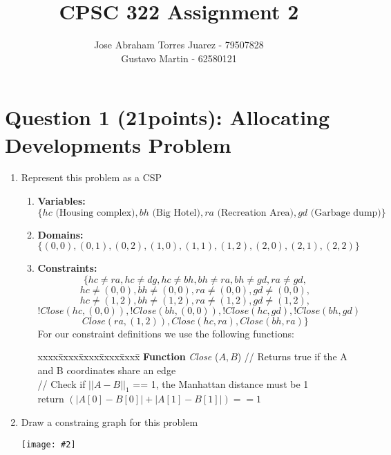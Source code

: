 \documentclass{article}
\def\ans#1{{\color{ans}#1}}
\newcommand{\centerfig}[2]{\begin{center}\texttt{[image: \#2]}\end{center}}
\begin{document}
\title{CPSC 322 Assignment 2}
\author{
    Jose Abraham Torres Juarez - 79507828 \\
    Gustavo Martin - 62580121
}
\date{}
\maketitle
\vspace{-2em}


\section{Question 1 (21points): Allocating Developments Problem}

\begin{enumerate}[label=(\alph*)]
    \item Represent this problem as a CSP
    \begin{enumerate}\color{ans}
        \item \textbf{Variables: }
        \[
            \{ hc \text{ (Housing complex)}, bh \text{ (Big Hotel)}, ra \text{ (Recreation Area)}, gd \text{ (Garbage dump)}\}
        \]
        \item \textbf{Domains: }
        \[
            \{ (0,0), (0,1), (0,2), (1,0), (1,1), (1,2), (2,0), (2,1), (2,2) \}
        \]
        \item \textbf{Constraints: }
        \[
            \{ hc \neq ra, hc \neq dg, hc \neq bh, bh \neq ra, bh \neq gd, ra \neq gd,
        \]
        \[
            hc \neq (0,0), bh \neq (0,0), ra \neq (0,0), gd \neq (0,0),
        \]
        \[
            hc \neq (1,2), bh \neq (1,2), ra \neq (1,2), gd \neq (1,2),
        \]
        \[
            !Close(hc,(0,0)), !Close(bh,(0,0)), !Close(hc,gd), !Close(bh,gd)
        \]
        \[
            Close(ra,(1,2)), Close(hc,ra), Close(bh,ra) \}
        \]
        \ans{
            For our constraint definitions we use the following functions:
        }
        \begin{tabbing}
        xxxx\=xxxx\=xxxx\=xxxx\=xxxx\= \kill \color{ans}
        {\bf Function} {\em Close} ($A,B$) // Returns true if the A and B coordinates share an edge \\ [0pt \color{ans}]
        \> // Check if $|| A - B ||_1$ == 1, the Manhattan distance must be 1\\
        \> return $( |A[0] - B[0]| + |A[1] - B[1]| ) == 1$ \\
        \end{tabbing}
    \end{enumerate}
    \item Draw a constraing graph for this problem
    \centerfig{0.8}{../figs/q1.png}
\end{enumerate}
\end{document}
